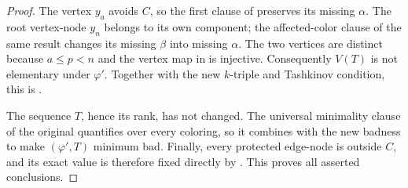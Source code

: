 \begin{proof}
The vertex \(y_a\) avoids \(C\), so the first clause of
 preserves its missing
\(\alpha\).  The root vertex-node \(y_n\) belongs to its own component;
the affected-color clause of the same result changes its missing
\(\beta\) into missing \(\alpha\).  The two vertices are distinct because
\(a\le p<n\) and the vertex map in  is injective.
Consequently \(V(T)\) is not elementary under \(\varphi'\).  Together
with the new \(k\)-triple and Tashkinov condition, this is
.

The sequence \(T\), hence its rank, has not changed.  The universal
minimality clause of the original 
quantifies over every coloring, so it combines with the new badness to
make \((\varphi',T)\) minimum bad.  Finally, every protected edge-node
is outside \(C\), and its exact value is therefore fixed directly by
.  This proves all asserted conclusions.
\end{proof}
